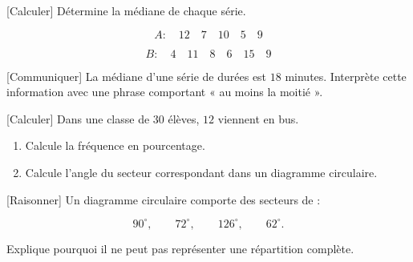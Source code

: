\documentclass[12pt,a4paper]{article}
\begin{document}

[Calculer]
Détermine la médiane de chaque série. 

\[
A:\quad12\quad7\quad10\quad5\quad9
\]

\[
B:\quad4\quad11\quad8\quad6\quad15\quad9
\]


[Communiquer]
La médiane d'une série de durées est \(18\) minutes.
Interprète cette information avec une phrase comportant
« au moins la moitié ». 


[Calculer]
Dans une classe de \(30\) élèves, \(12\) viennent en bus.

\begin{enumerate}
  \item Calcule la fréquence en pourcentage. 
  \item Calcule l'angle du secteur correspondant
        dans un diagramme circulaire. 
\end{enumerate}


[Raisonner]
Un diagramme circulaire comporte des secteurs de :

\[
90^\circ,\qquad72^\circ,\qquad126^\circ,\qquad62^\circ.
\]

Explique pourquoi il ne peut pas représenter une répartition complète. 

\end{document}
